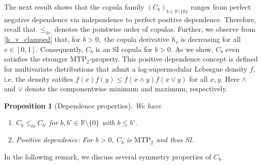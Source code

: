 \documentclass{article}
\theoremstyle{plain}
\newtheorem{proposition}{Proposition}
\theoremstyle{definition}
\newcommand{\R}{\mathbb{R}}
\begin{document}
The next result shows that the copula family \((C_b)_{b\in \R\setminus \{0\}}\) ranges from perfect negative dependence via independence to perfect positive dependence. Therefore, recall that \(\leq_{lo}\) denotes the pointwise order of copulas. Further, we observe from \eqref{h_v_clamped} that, for \(b>0,\) the copula derivative \(h_v\) is decreasing for all \(v\in [0,1]\). Consequently, \(C_b\) is an SI copula for \(b>0\). As we show, \(C_b\) even satisfies the stronger \(\mathrm{MTP}_2\)-property. This positive dependence concept is defined for multivariate distributions that admit a log-supermodular Lebesgue density \(f\), i.e. the density satifies \(f(x) f(y) \leq f(x\wedge y) f(x\vee y)\) for all \(x,y\). Here \(\wedge\) and \(\vee\) denote the componentwise minimum and maximum, respectively.

\begin{proposition}[Dependence properties]\label{propdepprop}
We have
\begin{enumerate}[label=(\roman*), font=\upshape]
    \item \label{propdepprop1}  \(C_b\leq_{lo} C_{b'}\) for \(b, b'\in \R\setminus\{0\}\) with \(b \leq b'\).
    \item \label{propdepprop2} Positive dependence: For \(b>0\), \(C_b\) is \(\mathrm{MTP}_2\) and thus SI.
\end{enumerate}
\end{proposition}

In the following remark, we discuss several symmetry properties of \(C_b\).
\end{document}
